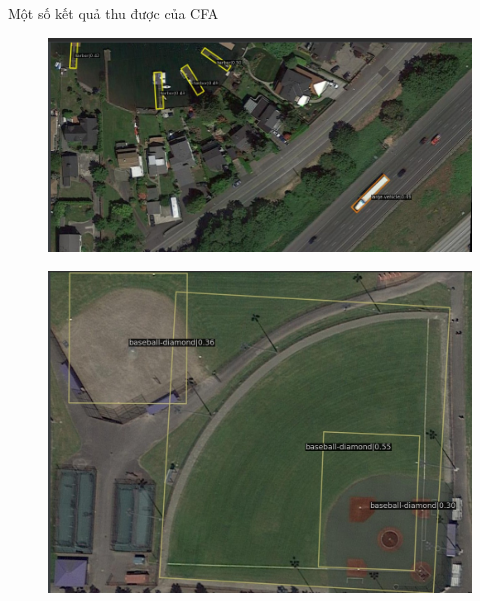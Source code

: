 \documentclass[11pt]{beamer}
\theoremstyle{definition}
\theoremstyle{plain}
\theoremstyle{plain}
\theoremstyle{remark}
\begin{document}
\begin{frame}{Một số kết quả thu được của CFA}
			
	\begin{figure}
		\centering
		\includegraphics[width=1\linewidth]{res_mmrotate3}
	
		\label{fig:resmmrotate3}
	\end{figure}
\end{frame}
\begin{frame}
	\begin{figure}
		\centering
		\includegraphics[width=0.8\linewidth]{res_mmrotate4}
	
		\label{fig:resmmrotate4}
	\end{figure}
\end{frame}
\end{document}
